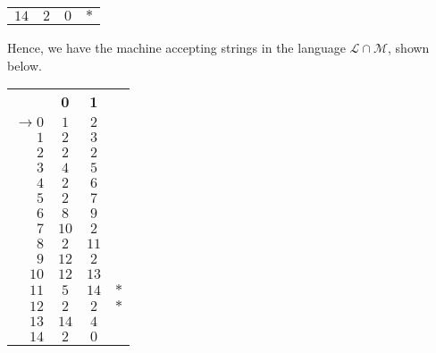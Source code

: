 \documentclass[a4paper,11pt]{article}
\begin{document}
\begin{enumerate}
\begin{center}
\begin{tabular}{r|c|c|l}
				$14$   & $2$  & $0$  & $\ast$ \\ \cline{2-3}
			\end{tabular}
		\end{center}
		Hence, we have the machine accepting strings in the language $\mathcal{L} \cap \mathcal{M}$, shown below.
		\begin{center}
			\begin{tabular}{r|c|c|l}
				\cline{2-3}
				& {\bf 0}& {\bf 1} & \\ \cline{2-3}
				$\to 0$& $1$  & $2$  &        \\ \cline{2-3}
				$1$	   & $2$  & $3$  &        \\ \cline{2-3}
				$2$	   & $2$  & $2$  &        \\ \cline{2-3}
				$3$	   & $4$  & $5$  &        \\ \cline{2-3}
				$4$	   & $2$  & $6$  &        \\ \cline{2-3}
				$5$	   & $2$  & $7$  &        \\ \cline{2-3}
				$6$	   & $8$  & $9$  &        \\ \cline{2-3}
				$7$	   & $10$ & $2$  &        \\ \cline{2-3}
				$8$	   & $2$  & $11$ &        \\ \cline{2-3}
				$9$	   & $12$ & $2$  &        \\ \cline{2-3}
				$10$   & $12$ & $13$ &        \\ \cline{2-3}
				$11$   & $5$  & $14$ & $\ast$\textbf{      } \\ \cline{2-3}
				$12$   & $2$  & $2$  & $\ast$ \\ \cline{2-3}
				$13$   & $14$ & $4$  &        \\ \cline{2-3}
				$14$   & $2$  & $0$  &        \\ \cline{2-3}
			\end{tabular}
		\end{center}
	\end{enumerate}
\end{document}
